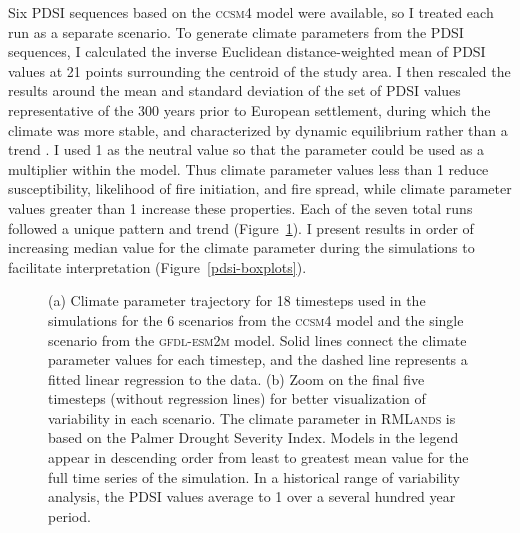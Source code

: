 Six PDSI sequences based on the \textsc{ccsm4} model were available, so I treated each run as a separate scenario. To generate climate parameters from the PDSI sequences, I calculated the inverse Euclidean distance-weighted mean of PDSI values at 21 points surrounding the centroid of the study area. I then rescaled the results around the mean and standard deviation of the set of PDSI values representative of the 300 years prior to European settlement, during which the climate was more stable, and characterized by dynamic equilibrium rather than a trend \citep{Cook2004,Diamond1969}. I used 1 as the neutral value so that the parameter could be used as a multiplier within the model. Thus climate parameter values less than 1 reduce susceptibility, likelihood of fire initiation, and fire spread, while climate parameter values greater than 1 increase these properties. Each of the seven total runs followed a unique pattern and trend (Figure~\ref{fig:pdsi_future}). I present results in order of increasing median value for the climate parameter during the simulations to facilitate interpretation (Figure~\ref{pdsi-boxplots}). %


\begin{figure}[!htbp]
\centering
    \caption{(a) Climate parameter trajectory for 18 timesteps used in the simulations for the 6 scenarios from the \textsc{ccsm4} model and the single scenario from the \textsc{gfdl-esm2m} model. Solid lines connect the climate parameter values for each timestep, and the dashed line represents a fitted linear regression to the data. (b) Zoom on the final five timesteps (without regression lines) for better visualization of variability in each scenario. The climate parameter in \textsc{RMLands} is based on the Palmer Drought Severity Index. Models in the legend appear in descending order from least to greatest mean value for the full time series of the simulation. In a historical range of variability analysis, the PDSI values average to 1 over a several hundred year period.}
\label{fig:pdsi_future}

\end{figure}

